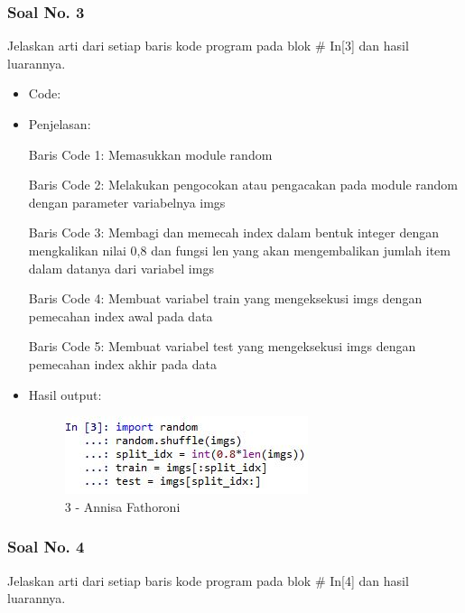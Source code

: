 \subsubsection{Soal No. 3}
Jelaskan arti dari setiap baris kode program pada blok \# In[3] dan hasil luarannya.

\begin{itemize}
\item Code:


\item Penjelasan:

Baris Code 1: Memasukkan module random

Baris Code 2: Melakukan pengocokan atau pengacakan pada module random dengan parameter variabelnya imgs

Baris Code 3: Membagi dan memecah index dalam bentuk integer dengan mengkalikan nilai 0,8 dan fungsi len yang akan mengembalikan jumlah item dalam datanya dari variabel imgs

Baris Code 4: Membuat variabel train yang mengeksekusi imgs dengan pemecahan index awal pada data

Baris Code 5: Membuat variabel test yang mengeksekusi imgs dengan pemecahan index akhir pada data

\item Hasil output:

\begin{figure}[!hbtp]
\centering
\includegraphics[scale=0.7]{figures/Chapter 7/1164067/Praktek/Chapter7AnnisaFathoroni3.jpg}
\caption{3 - Annisa Fathoroni}
\label{3 - Annisa Fathoroni}
\end{figure}

\end{itemize}

\subsubsection{Soal No. 4}
Jelaskan arti dari setiap baris kode program pada blok \# In[4] dan hasil luarannya.

